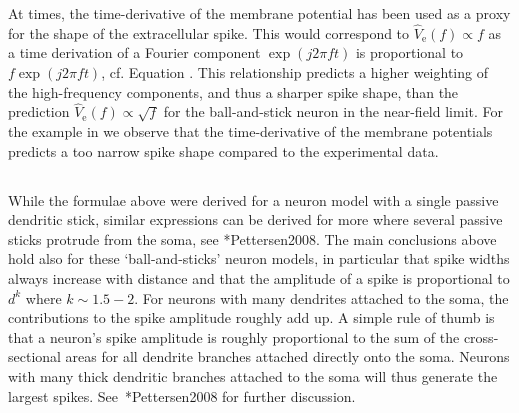 At times, the time-derivative of the membrane potential has been used as a proxy for the shape of the extracellular spike.
This would correspond to  $\hat{V}_\mathrm{e}(f) \propto f$ as a time derivation of a Fourier component   
$\exp (j 2 \pi f t)$  is proportional to $f \exp (j 2 \pi f t)$, cf. Equation . This relationship predicts a higher weighting of the high-frequency components, and thus a sharper spike shape, than the  prediction $\hat{V}_\mathrm{e}(f) \propto \sqrt{f}$ for the ball-and-stick neuron in the near-field limit. For the example in  we observe that the time-derivative of the membrane potentials predicts a too narrow spike shape compared to the experimental data.


\subsection{}
While the formulae above were derived for a neuron model with a single passive dendritic stick, similar expressions can be derived for more  where several passive sticks protrude from the soma, see \citeasnoun**{Pettersen2008}. The main conclusions above hold also for these `ball-and-sticks' neuron models, in particular that spike widths always increase with distance and that the amplitude of a spike is proportional to $d^{k}$ where $k\sim1.5-2$. For neurons with many dendrites attached to the soma, the contributions to the spike amplitude roughly add up. A simple rule of thumb is that a neuron's spike amplitude is roughly proportional to the sum of the cross-sectional areas for all dendrite branches attached directly onto the soma. Neurons with many thick dendritic branches attached to the soma will thus generate the largest spikes. See~\citeasnoun**{Pettersen2008} for further discussion.


